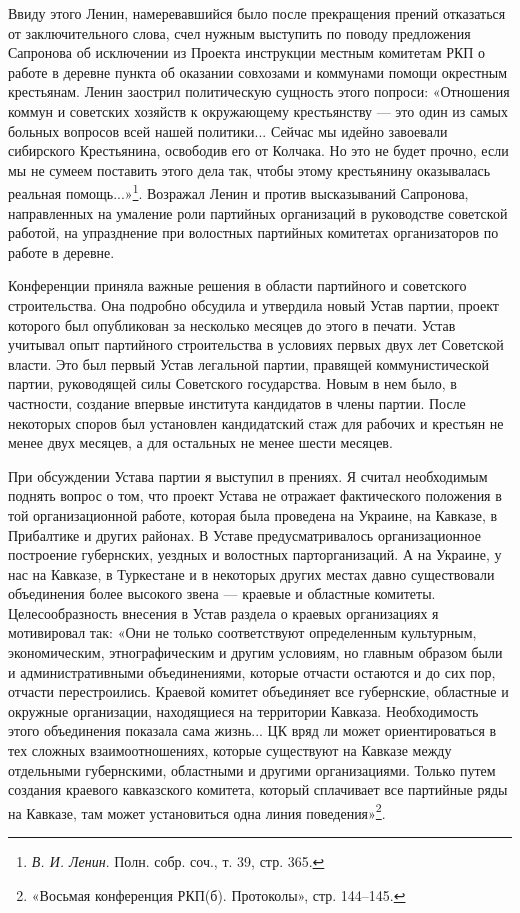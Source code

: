 \documentclass[12pt, a4paper, openany]{book}
\begin{document}
Ввиду этого Ленин, намеревавшийся было после прекращения прений отказаться от заключительного слова, счел нужным выступить по поводу предложения Сапронова об исключении из Проекта инструкции местным комитетам РКП о работе в деревне пункта об оказании совхозами и коммунами помощи окрестным крестьянам. Ленин заострил политическую сущность этого попроси: «Отношения коммун и советских хозяйств к окружающему крестьянству — это один из самых больных вопросов всей нашей политики... Сейчас мы идейно завоевали сибирского Крестьянина, освободив его от Колчака. Но это не будет прочно, если мы не сумеем поставить этого дела так, чтобы этому крестьянину оказывалась реальная помощь...»\footnote{\textit{В. И. Ленин}. Полн. собр. соч., т. 39, стр. 365.}. Возражал Ленин и против высказываний Сапронова, направленных на умаление роли партийных организаций в руководстве советской работой, на упразднение при волостных партийных комитетах организаторов по работе в деревне.

Конференции приняла важные решения в области партийного и советского строительства. Она подробно обсудила и утвердила новый Устав партии, проект которого был опубликован за несколько месяцев до этого в печати. Устав учитывал опыт партийного строительства в условиях первых двух лет Советской власти. Это был первый Устав легальной партии, правящей коммунистической партии, руководящей силы Советского государства. Новым в нем было, в частности, создание впервые института кандидатов в члены партии. После некоторых споров был установлен кандидатский стаж для рабочих и крестьян не менее двух месяцев, а для остальных не менее шести месяцев.

При обсуждении Устава партии я выступил в прениях. Я считал необходимым поднять вопрос о том, что проект Устава не отражает фактического положения в той организационной работе, которая была проведена на Украине, на Кавказе, в Прибалтике и других районах. В Уставе предусматривалось организационное построение губернских, уездных и волостных парторганизаций. А на Украине, у нас на Кавказе, в Туркестане и в некоторых других местах давно существовали объединения более высокого звена — краевые и областные комитеты. Целесообразность внесения в Устав раздела о краевых организациях я мотивировал так: «Они не только соответствуют определенным культурным, экономическим, этнографическим и другим условиям, но главным образом были и административными объединениями, которые отчасти остаются и до сих пор, отчасти перестроились. Краевой комитет объединяет все губернские, областные и окружные организации, находящиеся на территории Кавказа. Необходимость этого объединения показала сама жизнь... ЦК вряд ли может ориентироваться в тех сложных взаимоотношениях, которые существуют на Кавказе между отдельными губернскими, областными и другими организациями. Только путем создания краевого кавказского комитета, который сплачивает все партийные ряды на Кавказе, там может установиться одна линия поведения»\footnote{«Восьмая конференция РКП(б). Протоколы», стр. 144–145.}.
\end{document}
